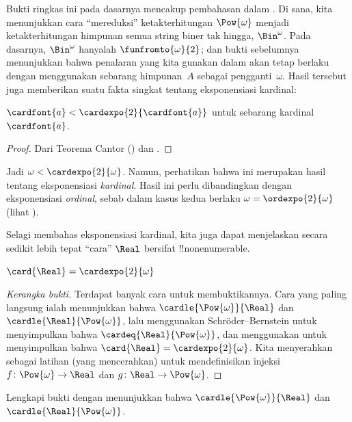 \documentclass[../../../include/open-logic-section]{subfiles}
\begin{document}
Bukti ringkas ini pada dasarnya mencakup pembahasan dalam
. Di sana, kita menunjukkan cara
``mereduksi'' ketakterhitungan $\Pow{\omega}$ menjadi ketakterhitungan
himpunan semua string biner tak hingga, $\Bin^\omega$. Pada dasarnya,
$\Bin^{\omega}$ hanyalah $\funfromto{\omega}{2}$; dan bukti sebelumnya
menunjukkan bahwa penalaran yang kita gunakan dalam
 akan tetap berlaku dengan menggunakan
sebarang himpunan~$A$ sebagai pengganti~$\omega$. Hasil tersebut juga
memberikan suatu fakta singkat tentang eksponensiasi kardinal:

\begin{cor}
$\cardfont{a} < \cardexpo{2}{\cardfont{a}}$ untuk sebarang
kardinal~$\cardfont{a}$.
\end{cor}

\begin{proof}
Dari Teorema Cantor () dan
.
\end{proof}
\noindent
Jadi $\omega < \cardexpo{2}{\omega}$. Namun, perhatikan bahwa ini merupakan
hasil tentang eksponensiasi \emph{kardinal}. Hasil ini perlu dibandingkan
dengan eksponensiasi \emph{ordinal}, sebab dalam kasus kedua berlaku
$\omega = \ordexpo{2}{\omega}$ (lihat
).

Selagi membahas eksponensiasi kardinal, kita juga dapat menjelaskan secara
sedikit lebih tepat ``cara'' $\Real$ bersifat !!{nonenumerable}.

\begin{thm}
$\card{\Real} = \cardexpo{2}{\omega}$
\end{thm}

\begin{proof}[Kerangka bukti]
Terdapat banyak cara untuk membuktikannya. Cara yang paling langsung ialah
menunjukkan bahwa $\cardle{\Pow{\omega}}{\Real}$ dan
$\cardle{\Real}{\Pow{\omega}}$, lalu menggunakan Schr\"oder--Bernstein untuk
menyimpulkan bahwa $\cardeq{\Real}{\Pow{\omega}}$, dan menggunakan
 untuk menyimpulkan bahwa
$\card{\Real} = \cardexpo{2}{\omega}$. Kita menyerahkan sebagai latihan
(yang mencerahkan) untuk mendefinisikan injeksi
$f \colon \Pow{\omega} \to \Real$ dan
$g \colon \Real \to \Pow{\omega}$.
\end{proof}

\begin{prob}
Lengkapi bukti  dengan
menunjukkan bahwa $\cardle{\Pow{\omega}}{\Real}$ dan
$\cardle{\Real}{\Pow{\omega}}$.
\end{prob}
\end{document}
